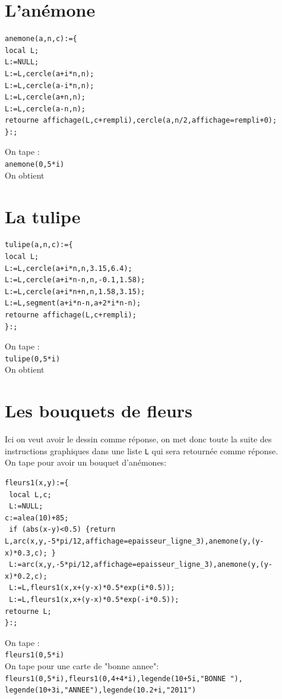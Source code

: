 \documentclass[a4paper,11pt]{book}
\begin{document}
\section{L'an\'emone}
\begin{verbatim}
anemone(a,n,c):={
local L;
L:=NULL;
L:=L,cercle(a+i*n,n);
L:=L,cercle(a-i*n,n);
L:=L,cercle(a+n,n);
L:=L,cercle(a-n,n);
retourne affichage(L,c+rempli),cercle(a,n/2,affichage=rempli+0);
}:;
\end{verbatim}
On tape :\\
{\tt anemone(0,5*i)}\\
On obtient 
\section{La tulipe}
\begin{verbatim}
tulipe(a,n,c):={
local L;
L:=L,cercle(a+i*n,n,3.15,6.4);
L:=L,cercle(a+i*n-n,n,-0.1,1.58);
L:=L,cercle(a+i*n+n,n,1.58,3.15);
L:=L,segment(a+i*n-n,a+2*i*n-n);
retourne affichage(L,c+rempli);
}:;
\end{verbatim}
On tape :\\
{\tt tulipe(0,5*i)}\\
On obtient 
\section{Les bouquets de fleurs}
Ici on veut avoir le dessin comme r\'eponse, on met donc toute la suite des 
instructions graphiques dans une liste {\tt L} qui sera retourn\'ee comme 
r\'eponse. \\
On tape pour avoir un bouquet d'an\'emones:
\begin{verbatim}
fleurs1(x,y):={
 local L,c;
 L:=NULL;
c:=alea(10)+85;
 if (abs(x-y)<0.5) {return L,arc(x,y,-5*pi/12,affichage=epaisseur_ligne_3),anemone(y,(y-x)*0.3,c); }
 L:=arc(x,y,-5*pi/12,affichage=epaisseur_ligne_3),anemone(y,(y-x)*0.2,c);
 L:=L,fleurs1(x,x+(y-x)*0.5*exp(i*0.5));
 L:=L,fleurs1(x,x+(y-x)*0.5*exp(-i*0.5));
retourne L;
}:;
\end{verbatim}
On tape :\\
{\tt fleurs1(0,5*i)}\\
On tape pour une carte de "bonne annee":\\
{\tt fleurs1(0,5*i),fleurs1(0,4+4*i),legende(10+5i,"BONNE "),
legende(10+3i,"ANNEE"),legende(10.2+i,"2011")}
\end{document}
